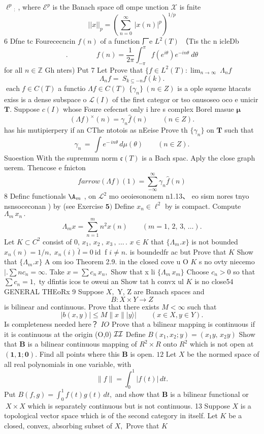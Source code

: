 $\ell^{p}{}_{:}$ , where ${\mathcal{E}}^{p}$ is the Banach space ofl ompe unction $\scriptstyle{\mathcal{X}}$ is fnite $$ ||x||_{p}=\left(\sum_{n=0}^{\infty}\,|x(n)|^{p}\right)^{1/p} $$ 6 Dfne tc Fourececncin $f(n)$ of a function 厂e $L^{2}(T)$ （Tis thc n icleDb $$ .\qquad\qquad f(n)=\frac{1}{2\pi}\int_{-\pi}^{\pi}f(e^{i\theta})e^{-i n\theta}~d\theta $$ for all $n\in\mathbb{Z}$ Gh nters) Put 7 Let Prove that $\{f\in L^{2}(T):\operatorname*{lim}_{n\to\infty}\ \Lambda_{n}f$ $$ \Lambda_{n}f=\ S_{k\subseteq-n}f(k). $$ $\operatorname{each}f\in C(T)$ a functio $\Lambda f\in C(T)$ $\{\gamma_{n}\}\ (n\in Z)$ is a ople squene htacats exiss is a dense subspace o ${\mathcal{L}}(I)$ of the first categor or tso onusoseo oco e unicir ${\boldsymbol{T}}.$ Suppose $c(I)$ whose Foure cefecnst only i hre s complex Borel masue ${\boldsymbol{\mu}}$ $$ (\Lambda f)^{\times}(n)=\gamma_{n}{\hat{f}}(n)\qquad(n\in Z). $$ has his mutipierpery if an CThe ntotois as nEeise Prove th $\{\gamma_{n}\}$ on ${\boldsymbol{T}}$ such that $$ \gamma_{n}\,=\,\int e^{-\,i n\theta}\,d\mu(\theta)\qquad(n\in Z). $$ Suoestion With the supremum norm ${\mathfrak{c}}(T)$ is a Bach spac. Aply the close graph uerem. Thencose e fnicton $$ f{ arrow}(\Lambda f)(1)=\sum_{-\infty}^{\infty}{\gamma}_{n}{\hat{f}}(n) $$ 8 Definc functionals $\mathrm{\A}_{m}$ , on ${\mathcal{L}}^{2}$ mo oeoiesononem n1.13、 eo sism nores tnyo nsnsoceconan ) by (see Exercise ${\boldsymbol{5}})$ Define $x_{n}\in\ell^{2}$ by is compact. Compute $\Lambda_{m}\,x_{n}\,.$ $$ \Lambda_{m}x=\sum_{n=1}^{m}n^{2}x(n)\qquad(m=1,\,2,\,3,\,\dots). $$ Let $K\subset C^{2}$ consist of $0,\,x_{1},\,x_{2}\,,\,x_{3}\,,\,\ldots\,.$ $x\in K$ that $\{\Lambda_{m}.x\}$ is not bounded $x_{n}(n)=1/n,\;x_{n}(i){\bar{\ l}}=0\mathrm{~id~}$ f $i\neq n.$ is boundedfr ac but Prove that $\textstyle K$ Show that $\{\Lambda_{m}.x\}$ A om ioo Theorem 2.9. in the closed cove u O $\textstyle K$ s no ovty niecemo $\left|\right. .\sum{n c_{n}}=\infty.$ Take $x=\sum c_{n}\,x_{n},$ Show that x li $\{\Lambda_{m}\,x_{m}\}$ Choose $c_{n}>0$ so that $\textstyle\sum c_{n}=1,$ ty dfintis icos te oweui an Show tat h convx ul $\textstyle K$ is no close54 GENERAL THEoRx 9 Suppose $X,$ Y, Z are Banach spaces and $$ B\colon X\times Y\to Z $$ is bilinear and continuous. Prove that there exists $M<\infty$ such that $$ |b(x,y)|\leq M\|x\||y\rangle|\qquad(x\in X,y\in Y). $$ Is completeness needed here？ $I O$ Prove that a bilinear mapping is continuous if it is continuous at the origin (O,0) ${\cal I}{\cal I}$ Define $B(x_{1},x_{2};y)=(x_{1}y,\,x_{2}y)$ Show that $\boldsymbol{B}$ is a bilinear continuous mapping of $R^{2}\times R$ onto $R^{2}$ which is not open at $(\mathbf{1},\mathbf{1};\mathbf{0}).$ Find all points where this $\boldsymbol{B}$ is open. ${\mathit{1}}{\mathit{2}}$ Let $X$ be the normed space of all real polynomials in one variable, with $$ \|f\|=\int_{0}^{1}\left|f(t)\right|\,d t. $$ Put $B(f,g)=\textstyle\int_{0}^{1}f(t)g(t)\,d t,$ and show that $\boldsymbol{B}$ is a bilinear functional or $\ X\times X$ which is separately continuous but is not continuous. 13 Suppose $X$ is a topological vector space which is of the second category in itself. Let $\textstyle K$ be a closed, convex, absorbing subset of $X,$ Prove that $\textstyle K$ 